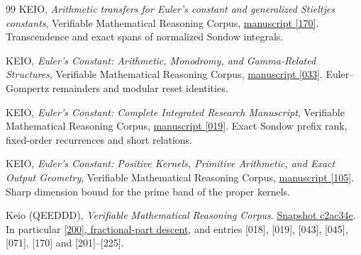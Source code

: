 \documentclass[11pt,a4paper,oneside,openany]{report}
\theoremstyle{remark}\newtheorem{remark}[theorem]{Remark}
\numberwithin{equation}{section}
\begin{document}
\begin{thebibliography}{99}
 KEIO, \emph{Arithmetic transfers for Euler's constant and generalized Stieltjes constants}, Verifiable Mathematical Reasoning Corpus, \href{https://github.com/QEEDDD/Verifiable-Mathematical-Reasoning-Corpus/blob/c2ac34ea4622778187173f41bb1996deee8081b7/\%5B170\%5D\%20gamma_46p.tex\#L1441}{manuscript [170]}. Transcendence and exact spans of normalized Sondow integrals.

 KEIO, \emph{Euler's Constant: Arithmetic, Monodromy, and Gamma-Related Structures}, Verifiable Mathematical Reasoning Corpus, \href{https://github.com/QEEDDD/Verifiable-Mathematical-Reasoning-Corpus/blob/c2ac34ea4622778187173f41bb1996deee8081b7/\%5B033\%5D\%20Euler\%E2\%80\%99s\%20Constant\%20Arithmetic\%2C\%20Monodromy\%2C\%20and\%20Gamma-Related\%20Structures.tex\#L4815}{manuscript [033]}. Euler--Gompertz remainders and modular reset identities.

 KEIO, \emph{Euler's Constant: Complete Integrated Research Manuscript}, Verifiable Mathematical Reasoning Corpus, \href{https://github.com/QEEDDD/Verifiable-Mathematical-Reasoning-Corpus/blob/c2ac34ea4622778187173f41bb1996deee8081b7/\%5B019\%5D\%20Euler\%E2\%80\%99s\%20Constant\%20Complete\%20Integrated\%20Research\%20Manuscript\%20\%28Exponential-Integral\%20Foundations\%2C\%20Positive\%20Moments\%2C\%20Infinite\%20Families\%2C\%20Local\%20Arithmetic\%2C\%20and\%20Transfer\%20Obstructions\%29.tex\#L1300}{manuscript [019]}. Exact Sondow prefix rank, fixed-order recurrences and short relations.

 KEIO, \emph{Euler's Constant: Positive Kernels, Primitive Arithmetic, and Exact Output Geometry}, Verifiable Mathematical Reasoning Corpus, \href{https://github.com/QEEDDD/Verifiable-Mathematical-Reasoning-Corpus/blob/c2ac34ea4622778187173f41bb1996deee8081b7/\%5B105\%5D\%20gamma_consolidated_positive_kernels_and_arithmetic_2026_11_02.tex\#L6837}{manuscript [105]}. Sharp dimension bound for the prime band of the proper kernels.

 Keio (QEEDDD), \emph{Verifiable Mathematical Reasoning Corpus}. \href{https://github.com/QEEDDD/Verifiable-Mathematical-Reasoning-Corpus/tree/c2ac34ea4622778187173f41bb1996deee8081b7}{Snapshot c2ac34e}. In particular \href{https://github.com/QEEDDD/Verifiable-Mathematical-Reasoning-Corpus/blob/c2ac34ea4622778187173f41bb1996deee8081b7/\%5B200\%5D\%20lattice_covering_flows.tex\#L160}{[200], fractional-part descent}, and entries [018], [019], [043], [045], [071], [170] and [201]--[225].


\end{thebibliography}
\end{document}
